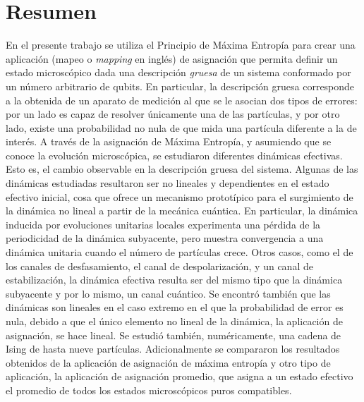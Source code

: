 \section*{Resumen}

En el presente trabajo se utiliza el Principio de Máxima Entropía para crear una aplicación (mapeo o \textit{mapping} en inglés) de asignación que permita definir un estado microscópico dada una descripción \textit{gruesa} de un sistema conformado por un número arbitrario de qubits. En particular, la descripción gruesa corresponde a la obtenida de un aparato de medición al que se le asocian dos tipos de errores: por un lado es capaz de resolver únicamente una de las partículas, y por otro lado, existe una probabilidad no nula de que mida una partícula diferente a la de interés. A través de la asignación de Máxima Entropía, y asumiendo que se conoce la evolución microscópica, se estudiaron diferentes dinámicas efectivas. Esto es, el cambio observable en la descripción gruesa del sistema. Algunas de las dinámicas estudiadas resultaron ser no lineales y dependientes en el estado efectivo inicial, cosa que ofrece un mecanismo prototípico para el surgimiento de la dinámica no lineal a partir de la mecánica cuántica. En particular, la dinámica inducida por evoluciones unitarias locales experimenta una pérdida de la periodicidad de la dinámica subyacente, pero muestra convergencia a una dinámica unitaria cuando el número de partículas crece. Otros casos, como el de los canales de desfasamiento, el canal de despolarización, y un canal de estabilización, la dinámica efectiva resulta ser del mismo tipo que la dinámica subyacente y por lo mismo, un canal cuántico. Se encontró también que las dinámicas son lineales en el caso extremo en el que la probabilidad de error es nula, debido a que el único elemento no lineal de la dinámica, la aplicación de asignación, se hace lineal. Se estudió también, numéricamente, una cadena de Ising de hasta nueve partículas. Adicionalmente se compararon los resultados obtenidos de la aplicación de asignación de máxima entropía y otro tipo de aplicación, la aplicación de asignación promedio, que asigna a un estado efectivo el promedio de todos los estados microscópicos puros compatibles.
